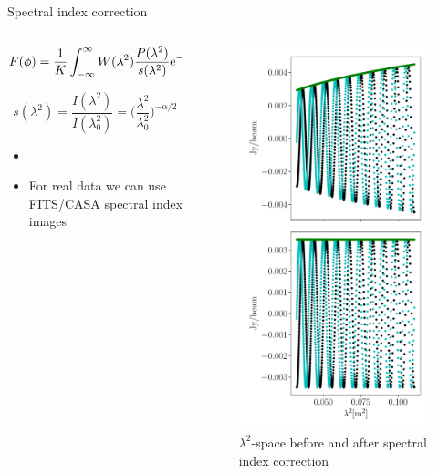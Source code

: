 \documentclass[xetex,aspectratio=169]{beamer}
\begin{document}
\begin{frame}{Spectral index correction}
	\begin{columns}[onlytextwidth,t]
		\begin{column}{.5\textwidth}
			\begin{equation*}
				F(\phi) = \frac{1}{K}\int_{-\infty}^{\infty}{W(\lambda^2)\frac{P(\lambda^2)}{s(\lambda^2)} {\rm e}^{-2i\phi \lambda^2}~{\rm d}\lambda^2 }
			\end{equation*}

			\begin{equation*}
				s(\lambda^2) = \frac{I(\lambda^2)}{I(\lambda^2_0)} = \biggl(\frac{\lambda^2}{\lambda^2_0}\biggr)^{-\alpha/2}
			\end{equation*}
			\vspace{1cm}
			\begin{itemize}
				\item ~\cite{brentjens}
				\item For real data we can use FITS/CASA spectral index images
			\end{itemize}
		\end{column}

		\begin{column}{.5\textwidth}
			\begin{figure}
				\centering
				\includegraphics[width=.4\textwidth]{figures/dataset_features/spectral_index_correction.pdf}
				\caption*{$\lambda^2$-space before and after spectral index correction}
			\end{figure}
		\end{column}

	\end{columns}
\end{frame}
\end{document}
